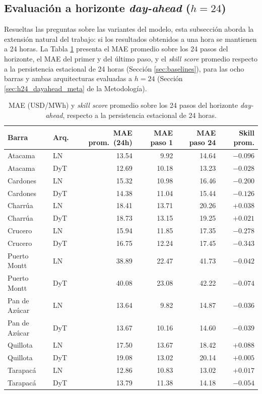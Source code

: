 \subsection{Evaluación a horizonte \textit{day-ahead} ($h=24$)}
\label{sec:h24_dayahead}

Resueltas las preguntas sobre las variantes del modelo, esta subsección aborda la extensión natural del trabajo: si los resultados obtenidos a una hora se mantienen a 24 horas. La Tabla \ref{tab:h24_resumen} presenta el MAE promedio sobre los 24 pasos del horizonte, el MAE del primer y del último paso, y el \textit{skill score} promedio respecto a la persistencia estacional de 24 horas (Sección \ref{sec:baselines}), para las ocho barras y ambas arquitecturas evaluadas a $h=24$ (Sección \ref{sec:h24_dayahead_meta} de la Metodología).

\begin{table}[htbp]
    \centering
    \small
    \begin{tabular}{llrrrr}
        \toprule
        Barra & Arq. & MAE prom.\ (24h) & MAE paso 1 & MAE paso 24 & Skill prom. \\
        \midrule
        Atacama       & LN  & 13.54 & 9.92  & 14.64 & $-0.096$ \\
        Atacama       & DyT & 12.69 & 10.18 & 13.23 & $-0.028$ \\
        Cardones      & LN  & 15.32 & 10.98 & 16.46 & $-0.200$ \\
        Cardones      & DyT & 14.38 & 11.04 & 15.44 & $-0.126$ \\
        Charrúa       & LN  & 18.41 & 13.71 & 20.26 & $+0.038$ \\
        Charrúa       & DyT & 18.73 & 13.15 & 19.25 & $+0.021$ \\
        Crucero       & LN  & 15.94 & 11.85 & 17.35 & $-0.278$ \\
        Crucero       & DyT & 16.75 & 12.24 & 17.45 & $-0.343$ \\
        Puerto Montt  & LN  & 38.89 & 22.47 & 41.73 & $-0.042$ \\
        Puerto Montt  & DyT & 40.08 & 23.08 & 42.22 & $-0.074$ \\
        Pan de Azúcar & LN  & 13.64 & 9.82  & 14.87 & $-0.036$ \\
        Pan de Azúcar & DyT & 13.67 & 10.16 & 14.60 & $-0.039$ \\
        Quillota      & LN  & 17.50 & 13.67 & 18.42 & $+0.088$ \\
        Quillota      & DyT & 19.08 & 13.02 & 20.14 & $+0.005$ \\
        Tarapacá      & LN  & 12.86 & 10.83 & 13.02 & $+0.017$ \\
        Tarapacá      & DyT & 13.79 & 11.38 & 14.18 & $-0.054$ \\
        \bottomrule
    \end{tabular}
    \vspace{0.2cm}
    \caption{MAE (USD/MWh) y \textit{skill score} promedio sobre los 24 pasos del horizonte \textit{day-ahead}, respecto a la persistencia estacional de 24 horas.}
    \label{tab:h24_resumen}
\end{table}

